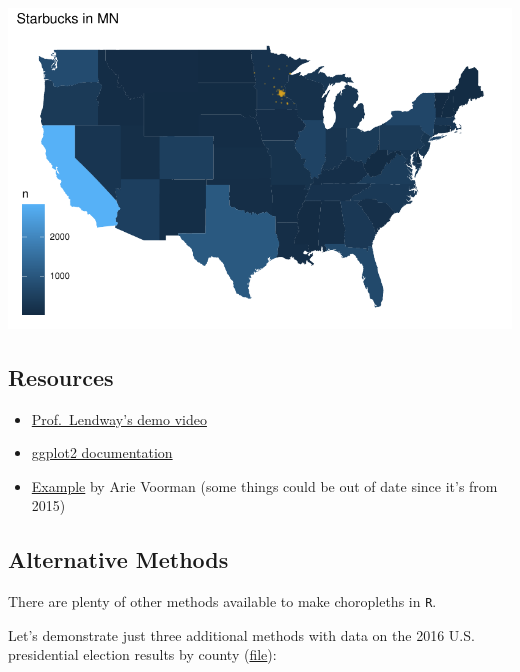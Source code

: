 \documentclass[
  letterpaper,
  DIV=11,
  numbers=noendperiod]{scrreprt}
\providecommand{\tightlist}{%
  \setlength{\itemsep}{0pt}\setlength{\parskip}{0pt}}\usepackage{longtable,booktabs,array}
\begin{document}
\includegraphics{src/06-Spatial_Viz_files/figure-pdf/unnamed-chunk-13-1.pdf}

\subsection*{Resources}\label{resources-1}

\begin{itemize}
\tightlist
\item
  \href{https://www.youtube.com/embed/iS59a5wDrEM}{Prof.~Lendway's demo
  video}
\item
  \href{https://ggplot2.tidyverse.org/reference/geom_map.html}{ggplot2
  documentation}\\
\item
  \href{https://rstudio-pubs-static.s3.amazonaws.com/78148_6dd49b5dab4c4f5a8b1a74e5893ff17d.html}{Example}
  by Arie Voorman (some things could be out of date since it's from
  2015)
\end{itemize}

\subsection*{Alternative Methods}\label{alternative-methods}

There are plenty of other methods available to make choropleths in
\texttt{R}.

Let's demonstrate just three additional methods with data on the 2016
U.S. presidential election results by county
(\href{data/electionDemographics16.csv}{file}):
\end{document}
